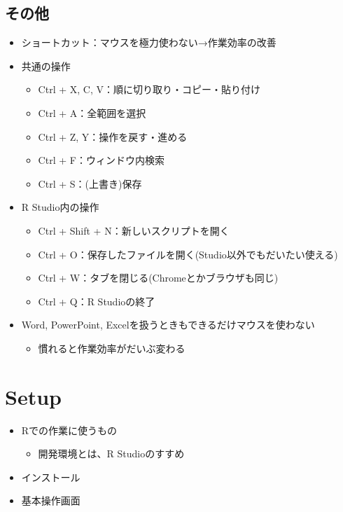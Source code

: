 \documentclass[
]{ltjsarticle}
\providecommand{\tightlist}{%
  \setlength{\itemsep}{0pt}\setlength{\parskip}{0pt}}
\begin{document}
\hypertarget{ux305dux306eux4ed6}{%
\subsection{その他}\label{ux305dux306eux4ed6}}

\begin{itemize}
\tightlist
\item
  ショートカット：マウスを極力使わない→作業効率の改善
\item
  共通の操作

  \begin{itemize}
  \tightlist
  \item
    Ctrl + X, C, V：順に切り取り・コピー・貼り付け
  \item
    Ctrl + A：全範囲を選択
  \item
    Ctrl + Z, Y：操作を戻す・進める
  \item
    Ctrl + F：ウィンドウ内検索
  \item
    Ctrl + S：(上書き)保存
  \end{itemize}
\item
  R Studio内の操作

  \begin{itemize}
  \tightlist
  \item
    Ctrl + Shift + N：新しいスクリプトを開く
  \item
    Ctrl + O：保存したファイルを開く(Studio以外でもだいたい使える)
  \item
    Ctrl + W：タブを閉じる(Chromeとかブラウザも同じ)
  \item
    Ctrl + Q：R Studioの終了
  \end{itemize}
\item
  Word, PowerPoint, Excelを扱うときもできるだけマウスを使わない

  \begin{itemize}
  \tightlist
  \item
    慣れると作業効率がだいぶ変わる
  \end{itemize}
\end{itemize}

\hypertarget{setup}{%
\section{Setup}\label{setup}}

\begin{itemize}
\tightlist
\item
  Rでの作業に使うもの

  \begin{itemize}
  \tightlist
  \item
    開発環境とは、R Studioのすすめ
  \end{itemize}
\item
  インストール
\item
  基本操作画面
\end{itemize}
\end{document}
